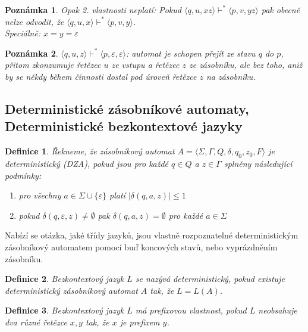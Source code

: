 \documentclass[10pt,a4paper]{article}
\theoremstyle{note}
\newtheorem{definice}{Definice}
\newtheorem{poznamka}{Poznámka}
\begin{document}
\begin{poznamka}
Opak 2. vlastnosti neplatí: Pokud $\langle q,u,xz \rangle \vdash^* \langle p,v,yz \rangle$ pak obecně nelze odvodit, že $\langle q,u,x \rangle \vdash^* \langle p,v,y \rangle$.\\
Speciálně: $x=y=\varepsilon$
\end{poznamka}

\begin{poznamka}
$\langle q,u,z \rangle \vdash^* \langle p,\varepsilon,\varepsilon \rangle$: automat je schopen přejít ze stavu $q$ do $p$, přitom zkonzumuje řetězec $u$ ze vstupu a řetězec $z$ ze zásobníku, ale bez toho, aniž by se někdy během činnosti dostal pod úroveň řetězce $z$ na zásobníku.
\end{poznamka}

	\subsection{Deterministické zásobníkové automaty, Deterministické bezkontextové jazyky}

	
\begin{definice}
Řekneme, že zásobníkový automat $A = \langle \Sigma,\Gamma,Q,\delta,q_0,z_0,F \rangle$ je \textit{deterministický} (DZA), pokud jsou pro každé $q \in Q$ a $z \in \Gamma$ splněny následující podmínky:
\begin{enumerate}
\item
pro všechny $a \in \Sigma \cup \lbrace \varepsilon \rbrace$ platí $|\delta (q,a,z)| \le 1$
\item
pokud $\delta (q,\varepsilon,z) \neq \emptyset$ pak $\delta (q,a,z) = \emptyset$ pro každé $a \in \Sigma$
\end{enumerate}
\end{definice}

Nabízí se otázka, jaké třídy jazyků, jsou vlastně rozpoznatelné deterministickým zásobníkový automatem pomocí buď koncových stavů, nebo vyprázdněním zásobníku.

\begin{definice}
Bezkontextový jazyk $L$ se nazývá \textit{deterministický}, pokud existuje deterministický zásobníkový automat $A$ tak, že $L = L(A)$.
\end{definice}

\begin{definice}
Bezkontextový jazyk $L$ má \textit{prefixovou vlastnost}, pokud $L$ neobsahuje dva různé řetězce $x,y$ tak, že $x$ je prefixem $y$.
\end{definice}
\end{document}
